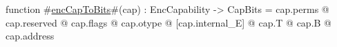 function #\hyperref[sailRISCVzencCapToBits]{encCapToBits}#(cap) : EncCapability -> CapBits =
  cap.perms @
  cap.reserved @
  cap.flags @
  cap.otype @
  [cap.internal_E] @
  cap.T @
  cap.B @
  cap.address
